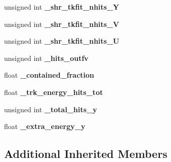 \begin{DoxyCompactItemize}
\item 
\hypertarget{classselection_1_1CC0piNpSelection_ae3a53326b19594013c9df08b66ccaa73}{unsigned int {\bfseries \-\_\-shr\-\_\-tkfit\-\_\-nhits\-\_\-\-Y}}\label{classselection_1_1CC0piNpSelection_ae3a53326b19594013c9df08b66ccaa73}

\item 
\hypertarget{classselection_1_1CC0piNpSelection_adab23c54dd799cdf83c31a10e4ae9061}{unsigned int {\bfseries \-\_\-shr\-\_\-tkfit\-\_\-nhits\-\_\-\-V}}\label{classselection_1_1CC0piNpSelection_adab23c54dd799cdf83c31a10e4ae9061}

\item 
\hypertarget{classselection_1_1CC0piNpSelection_a6c75f5783174133ce97849f128f3dee3}{unsigned int {\bfseries \-\_\-shr\-\_\-tkfit\-\_\-nhits\-\_\-\-U}}\label{classselection_1_1CC0piNpSelection_a6c75f5783174133ce97849f128f3dee3}

\item 
\hypertarget{classselection_1_1CC0piNpSelection_ac39ec79d190fb925f8d20b03cbeb0605}{unsigned int {\bfseries \-\_\-hits\-\_\-outfv}}\label{classselection_1_1CC0piNpSelection_ac39ec79d190fb925f8d20b03cbeb0605}

\item 
\hypertarget{classselection_1_1CC0piNpSelection_a8e7933222bce1424aee24bae8dcf4864}{float {\bfseries \-\_\-contained\-\_\-fraction}}\label{classselection_1_1CC0piNpSelection_a8e7933222bce1424aee24bae8dcf4864}

\item 
\hypertarget{classselection_1_1CC0piNpSelection_a82a48c6128c34252642d237b98f1b66a}{float {\bfseries \-\_\-trk\-\_\-energy\-\_\-hits\-\_\-tot}}\label{classselection_1_1CC0piNpSelection_a82a48c6128c34252642d237b98f1b66a}

\item 
\hypertarget{classselection_1_1CC0piNpSelection_a819d1d973e74bcd2ad82aa01ea24ac37}{unsigned int {\bfseries \-\_\-total\-\_\-hits\-\_\-y}}\label{classselection_1_1CC0piNpSelection_a819d1d973e74bcd2ad82aa01ea24ac37}

\item 
\hypertarget{classselection_1_1CC0piNpSelection_a2e386c361ecc27d22ff2642e80a629e4}{float {\bfseries \-\_\-extra\-\_\-energy\-\_\-y}}\label{classselection_1_1CC0piNpSelection_a2e386c361ecc27d22ff2642e80a629e4}

\end{DoxyCompactItemize}
\subsection*{Additional Inherited Members}


